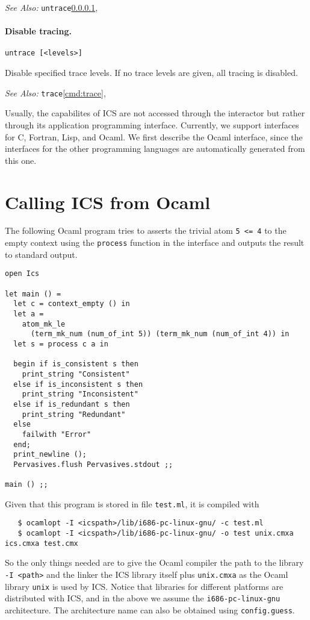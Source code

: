 \documentclass[12pt]{article}
\begin{document}
\noindent
{\em See Also:}  
\texttt{untrace}\ref{cmd:untrace},


\paragraph{Disable tracing.}\label{cmd:untrace}
  \begin{center}
  \texttt{untrace [<levels>]}
  \end{center}
Disable specified trace levels. If no trace levels are given,
all tracing is disabled.

\noindent
{\em See Also:}  
\texttt{trace}\ref{cmd:trace},




Usually, the capabilites of ICS are not accessed through the interactor
but rather through its application programming interface.  Currently,
we support interfaces for C, Fortran, Lisp, and Ocaml.  We first describe the Ocaml 
interface, since the interfaces for the other programming languages are automatically 
generated from this one.

\label{sec:api}

\section{Calling ICS from Ocaml}

The following Ocaml program tries to asserts the trivial atom 
{\tt 5 <= 4} to the empty context using the {\tt process} function
in the interface and outputs the result to standard output.
\begin{verbatim}
open Ics

let main () =
  let c = context_empty () in
  let a = 
    atom_mk_le 
      (term_mk_num (num_of_int 5)) (term_mk_num (num_of_int 4)) in
  let s = process c a in
  
  begin if is_consistent s then
    print_string "Consistent"
  else if is_inconsistent s then
    print_string "Inconsistent"
  else if is_redundant s then
    print_string "Redundant"
  else
    failwith "Error"
  end;
  print_newline ();
  Pervasives.flush Pervasives.stdout ;;

main () ;;
\end{verbatim}

Given that this program is stored in file {\tt test.ml}, it is compiled with
\begin{verbatim}
   $ ocamlopt -I <icspath>/lib/i686-pc-linux-gnu/ -c test.ml
   $ ocamlopt -I <icspath>/lib/i686-pc-linux-gnu/ -o test unix.cmxa ics.cmxa test.cmx
\end{verbatim}
So the only things needed are to give the Ocaml compiler the path to the library
{\tt -I <path>} and the linker the ICS library itself plus {\tt unix.cmxa} as 
the Ocaml library {\tt unix} is used  by ICS. Notice that libraries for different
platforms are distributed with ICS, and in the above we assume the 
{\tt i686-pc-linux-gnu} architecture. The architecture name can also be obtained
using {\tt config.guess}\@.
\end{document}
